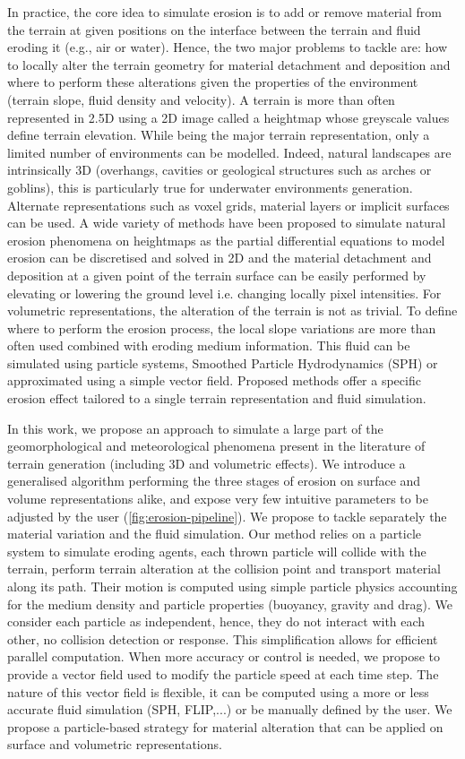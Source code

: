 In practice, the core idea to simulate erosion is to add or remove material from the terrain at given positions on the interface between the terrain and fluid eroding it (e.g., air or water). Hence, the two major problems to tackle are: how to locally alter the terrain geometry for material detachment and deposition and where to perform these alterations given the properties of the environment (terrain slope, fluid density and velocity).
A terrain is more than often represented in 2.5D using a 2D image called a heightmap whose greyscale values define terrain elevation. While being the major terrain representation, only a limited number of environments can be modelled. Indeed, natural landscapes are intrinsically 3D (overhangs, cavities or geological structures such as arches or goblins), this is particularly true for underwater environments generation. Alternate representations such as voxel grids, material layers or implicit surfaces can be used. A wide variety of methods have been proposed to simulate natural erosion phenomena on heightmaps as the partial differential equations to model erosion can be discretised and solved in 2D and the material detachment and deposition at a given point of the terrain surface can be easily performed by elevating or lowering the ground level i.e. changing locally pixel intensities.
For volumetric representations, the alteration of the terrain is not as trivial.
To define where to perform the erosion process, the local slope variations are more than often used combined with eroding medium information. This fluid can be simulated using particle systems, Smoothed Particle Hydrodynamics (SPH) \cite{Kristof2009} or approximated using a simple vector field.
Proposed methods offer a specific erosion effect tailored to a single terrain representation and fluid simulation.

In this work, we propose an approach to simulate a large part of the geomorphological and meteorological phenomena present in the literature of terrain generation (including 3D and volumetric effects). We introduce a generalised algorithm performing the three stages of erosion on surface and volume representations alike, and expose very few intuitive parameters to be adjusted by the user (\cref{fig:erosion-pipeline}).
We propose to tackle separately the material variation and the fluid simulation. Our method relies on a particle system to simulate eroding agents, each thrown particle will collide with the terrain, perform terrain alteration at the collision point and transport material along its path.
Their motion is computed using simple particle physics accounting for the medium density and particle properties (buoyancy, gravity and drag). We consider each particle as independent, hence, they do not interact with each other, no collision detection or response. This simplification allows for efficient parallel computation.
When more accuracy or control is needed, we propose to provide a vector field used to modify the particle speed at each time step. The nature of this vector field is flexible, it can be computed using a more or less accurate fluid simulation (SPH, FLIP,...) or be manually defined by the user. We propose a particle-based strategy for material alteration that can be applied on surface and volumetric representations.

